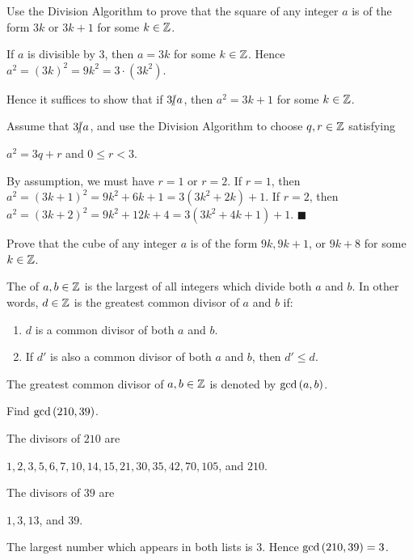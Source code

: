 \documentclass[11pt,fleqn,dvipsnames,usenames]{article}
\newcommand{\p}{\noindent}
\newcommand{\ENDPRF}{\hfill $\blacksquare$}
\begin{document}
\begin{example}
Use the Division Algorithm to prove that the square of any integer $a$ is of the form $3k$ or $3k+1$ for some $k\in\mathbb{Z}$.
\end{example}

\solution If $a$ is divisible by $3$, then $a = 3k$ for some $k\in\mathbb{Z}$.  Hence $a^2 = (3k)^2 = 9k^2 =  3\cdot (3k^2)$.
\vsp

\p Hence it suffices to show that if $3|\kern-0.9ex{/} a$, then $a^2 = 3k +1$ for some $k\in\mathbb{Z}$.
\vsp

\p Assume that $3|\kern-0.9ex{/} a$, and use the Division Algorithm to choose $q,r\in\mathbb{Z}$ satisfying
\begin{center}
$a^2 = 3q + r$ and $0 \leq r < 3$.
\end{center}
\p By assumption, we must have $r=1$ or $r=2$.  If $r = 1$, then $a^2 = (3k+1)^2 = 9k^2 + 6k + 1 = 3(3k^2 + 2k) + 1$.  If $r = 2$, then $a^2 = (3k+2)^2 = 9k^2 + 12k + 4 = 3(3k^2 + 4k + 1) + 1$. \ENDPRF
\vsp

\begin{exercise}
Prove that the cube of any integer $a$ is of the form $9k, 9k+1$, or $9k+8$ for some $k\in\mathbb{Z}$.
\end{exercise}

 The  of $a,b\in\mathbb{Z}$ is the largest of all integers which divide both $a$ and $b$.  In other words, $d\in\mathbb{Z}$ is the greatest common divisor of $a$ and $b$ if:
\begin{enumerate}[(1)]
\item $d$ is a common divisor of both $a$ and $b$.
\item If $d'$ is also a common divisor of both $a$ and $b$, then $d'\leq d$.
\end{enumerate}
\vsp

\notation The greatest common divisor of $a,b\in\mathbb{Z}$ is denoted by $\text{gcd}\left(a,b\right)$.
\vsp

\begin{example}
Find $\text{gcd}\left(210,39\right)$.
\end{example}

\solution The divisors of $210$ are
\begin{center}
$1,2,3,5,6,7,10, 14, 15, 21, 30, 35, 42, 70, 105$, and $210$.
\end{center}
The divisors of $39$ are
\begin{center}
$1,3,13$, and $39$.
\end{center}
\p The largest number which appears in both lists is $3$.  Hence $\text{gcd}\left(210,39\right) = 3$.
\vsp
\end{document}
